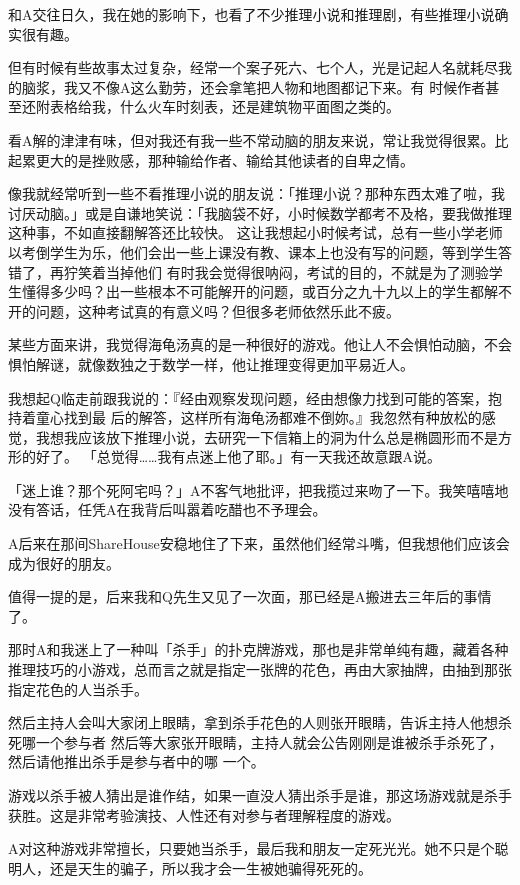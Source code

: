 \documentclass{article}
\begin{document}
和A交往日久，我在她的影响下，也看了不少推理小说和推理剧，有些推理小说确实很有趣。 

但有时候有些故事太过复杂，经常一个案子死六、七个人，光是记起人名就耗尽我的脑浆，我又不像A这么勤劳，还会拿笔把人物和地图都记下来。有
\newpage
时候作者甚至还附表格给我，什么火车时刻表，还是建筑物平面图之类的。 

看A解的津津有味，但对我还有我一些不常动脑的朋友来说，常让我觉得很累。比起累更大的是挫败感，那种输给作者、输给其他读者的自卑之情。 

像我就经常听到一些不看推理小说的朋友说：「推理小说？那种东西太难了啦，我讨厌动脑。」或是自谦地笑说：「我脑袋不好，小时候数学都考不及格，要我做推理这种事，不如直接翻解答还比较快。
这让我想起小时候考试，总有一些小学老师以考倒学生为乐，他们会出一些上课没有教、课本上也没有写的问题，等到学生答错了，再狞笑着当掉他们
有时我会觉得很呐闷，考试的目的，不就是为了测验学生懂得多少吗？出一些根本不可能解开的问题，或百分之九十九以上的学生都解不开的问题，这种考试真的有意义吗？但很多老师依然乐此不疲。 

某些方面来讲，我觉得海龟汤真的是一种很好的游戏。他让人不会惧怕动脑，不会惧怕解谜，就像数独之于数学一样，他让推理变得更加平易近人。 

我想起Q临走前跟我说的：『经由观察发现问题，经由想像力找到可能的答案，抱持着童心找到最
\newpage
后的解答，这样所有海龟汤都难不倒妳。』我忽然有种放松的感觉，我想我应该放下推理小说，去研究一下信箱上的洞为什么总是椭圆形而不是方形的好了。
「总觉得……我有点迷上他了耶。」有一天我还故意跟A说。 

「迷上谁？那个死阿宅吗？」A不客气地批评，把我揽过来吻了一下。我笑嘻嘻地没有答话，任凭A在我背后叫嚣着吃醋也不予理会。 

A后来在那间ShareHouse安稳地住了下来，虽然他们经常斗嘴，但我想他们应该会成为很好的朋友。 

值得一提的是，后来我和Q先生又见了一次面，那已经是A搬进去三年后的事情了。 

那时A和我迷上了一种叫「杀手」的扑克牌游戏，那也是非常单纯有趣，藏着各种推理技巧的小游戏，总而言之就是指定一张牌的花色，再由大家抽牌，由抽到那张指定花色的人当杀手。 

然后主持人会叫大家闭上眼睛，拿到杀手花色的人则张开眼睛，告诉主持人他想杀死哪一个参与者
然后等大家张开眼睛，主持人就会公告刚刚是谁被杀手杀死了，然后请他推出杀手是参与者中的哪
\newpage
一个。 

游戏以杀手被人猜出是谁作结，如果一直没人猜出杀手是谁，那这场游戏就是杀手获胜。这是非常考验演技、人性还有对参与者理解程度的游戏。 

A对这种游戏非常擅长，只要她当杀手，最后我和朋友一定死光光。她不只是个聪明人，还是天生的骗子，所以我才会一生被她骗得死死的。 
\end{document}

